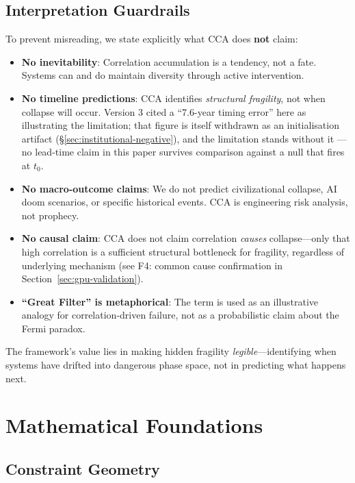 \documentclass[11pt,a4paper]{article}
\theoremstyle{definition}
\theoremstyle{remark}
\begin{document}
\subsection{Interpretation Guardrails}

To prevent misreading, we state explicitly what CCA does \textbf{not} claim:

\begin{itemize}[noitemsep]
    \item \textbf{No inevitability}: Correlation accumulation is a tendency, not a fate. Systems can and do maintain diversity through active intervention.
    \item \textbf{No timeline predictions}: CCA identifies \textit{structural fragility}, not when collapse will occur. Version 3 cited a ``7.6-year timing error'' here as illustrating the limitation; that figure is itself withdrawn as an initialisation artifact (\S\ref{sec:institutional-negative}), and the limitation stands without it --- no lead-time claim in this paper survives comparison against a null that fires at $t_0$.
    \item \textbf{No macro-outcome claims}: We do not predict civilizational collapse, AI doom scenarios, or specific historical events. CCA is engineering risk analysis, not prophecy.
    \item \textbf{No causal claim}: CCA does not claim correlation \textit{causes} collapse---only that high correlation is a sufficient structural bottleneck for fragility, regardless of underlying mechanism (see F4: common cause confirmation in Section~\ref{sec:gpu-validation}).
    \item \textbf{``Great Filter'' is metaphorical}: The term is used as an illustrative analogy for correlation-driven failure, not as a probabilistic claim about the Fermi paradox.
\end{itemize}

\noindent The framework's value lies in making hidden fragility \textit{legible}---identifying when systems have drifted into dangerous phase space, not in predicting what happens next.

\section{Mathematical Foundations}

\subsection{Constraint Geometry}
\end{document}
